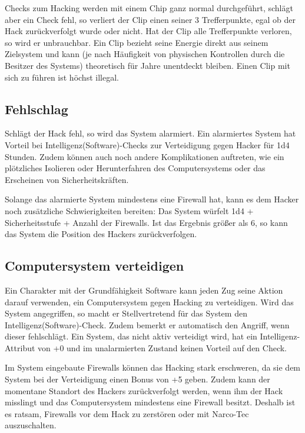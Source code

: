 Checks zum Hacking werden mit einem Chip ganz normal durchgeführt, schlägt aber ein Check fehl, so verliert der Clip einen seiner 3 Trefferpunkte, egal ob der Hack zurückverfolgt wurde oder nicht. Hat der Clip alle Trefferpunkte verloren, so wird er unbrauchbar.
Ein Clip bezieht seine Energie direkt aus seinem Zielsystem und kann (je nach Häufigkeit von physischen Kontrollen durch die Besitzer des Systems) theoretisch für Jahre unentdeckt bleiben. Einen Clip mit sich zu führen ist höchst illegal.
\subsection{Fehlschlag}
Schlägt der Hack fehl, so wird das System alarmiert. Ein alarmiertes System hat Vorteil bei Intelligenz(Software)-Checks zur Verteidigung gegen Hacker für 1d4 Stunden. Zudem können auch noch andere Komplikationen auftreten, wie ein plötzliches Isolieren oder Herunterfahren des Computersystems oder das Erscheinen von Sicherheitskräften.

Solange das alarmierte System mindestens eine Firewall hat, kann es dem Hacker noch zusätzliche Schwierigkeiten bereiten: Das System würfelt 1d4 + Sicherheitsstufe + Anzahl der Firewalls. Ist das Ergebnis größer als 6, so kann das System die Position des Hackers zurückverfolgen.
\subsection{Computersystem verteidigen}
Ein Charakter mit der Grundfähigkeit \glqq Software\grqq{} kann jeden Zug seine Aktion darauf verwenden, ein Computersystem gegen Hacking zu verteidigen. Wird das System angegriffen, so macht er Stellvertretend für das System den Intelligenz(Software)-Check. Zudem bemerkt er automatisch den Angriff, wenn dieser fehlschlägt. Ein System, das nicht aktiv verteidigt wird, hat ein Intelligenz-Attribut von +0 und im unalarmierten Zustand keinen Vorteil auf den Check.

Im System eingebaute Firewalls können das Hacking stark erschweren, da sie dem System bei der Verteidigung einen Bonus von +5 geben. Zudem kann der momentane Standort des Hackers zurückverfolgt werden, wenn ihm der Hack misslingt und das Computersystem mindestens eine Firewall besitzt. Deshalb ist es ratsam, Firewalls vor dem Hack zu zerstören oder mit Narco-Tec auszuschalten. 